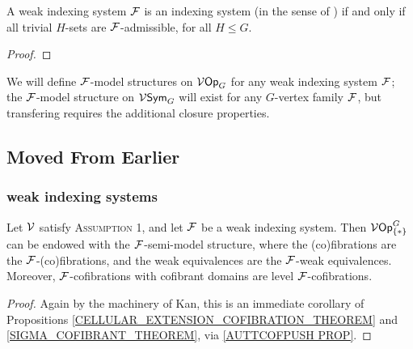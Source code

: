 \documentclass[a4paper,10pt]{article}%
\begin{document}
\begin{lemma}
  A weak indexing system $\mathcal F$ is an indexing system (in the sense of \cite{BH15}) if and only if all trivial $H$-sets are $\mathcal F$-admissible, for all $H\leq G$.
\end{lemma}
\begin{proof}
\end{proof}

We will define $\mathcal F$-model structures on $\mathcal V\mathsf{Op}_G$ for any weak indexing system $\mathcal F$; the $\mathcal F$-model structure on $\mathcal V\mathsf{Sym}_G$ will exist for any $G$-vertex family $\mathcal F$, but transfering requires the additional closure properties.


\subsection{Moved From Earlier}


\subsubsection{weak indexing systems}

\begin{theorem}
  \label{G_OP_SEMI_THEOREM}
  Let $\mathcal V$ satisfy \textsc{Assumption 1}, and let $\mathcal F$ be a weak indexing system. Then $\mathcal V\mathsf{Op}^G_{\left\{*\right\}}$ can be endowed with the $\mathcal F$-semi-model structure, where the (co)fibrations are the $\mathcal F$-(co)fibrations, and the weak equivalences are the $\mathcal F$-weak equivalences. Moreover, $\mathcal F$-cofibrations with cofibrant domains are level $\mathcal F$-cofibrations.
\end{theorem}
\begin{proof}
  Again by the machinery of Kan, this is an immediate corollary of Propositions \ref{CELLULAR_EXTENSION_COFIBRATION_THEOREM} and \ref{SIGMA_COFIBRANT_THEOREM}, via \ref{AUTTCOFPUSH PROP}.
\end{proof}
\end{document}
